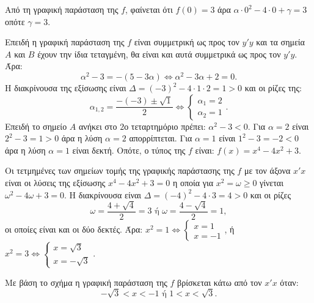 
\begin{alist}
\item Από τη γραφική παράσταση της $f$, φαίνεται ότι $f(0) = 3$ άρα $\alpha \cdot 0^2 - 4 \cdot 0 + \gamma = 3$ οπότε
$\gamma = 3$.

\item Επειδή η γραφική παράσταση της $f$ είναι συμμετρική ως προς τον $y'y$ και τα σημεία $A$ και
$B$ έχουν την ίδια τεταγμένη, θα είναι και αυτά συμμετρικά ως προς τον $y'y$. Άρα:
\[\alpha^2 - 3 = -(5 - 3\alpha) \Leftrightarrow \alpha^2 - 3\alpha + 2 = 0.\]
Η διακρίνουσα της εξίσωσης είναι $\Delta = (-3)^2 - 4 \cdot 1 \cdot 2 = 1 > 0$ και οι ρίζες της:
\[\alpha_{1, 2} = \dfrac{-(-3) \pm \sqrt{1}}{2} \Leftrightarrow \begin{cases} \alpha_1 = 2 \\ \alpha_2 = 1 \end{cases}.\]
Επειδή το σημείο $A$ ανήκει στο $2$ο τεταρτημόριο πρέπει:
$\alpha^2 - 3 < 0$.
Για $\alpha = 2$ είναι $2^2 - 3 = 1 > 0$ άρα η λύση $\alpha = 2$ απορρίπτεται.
Για $\alpha = 1$ είναι $1^2 - 3 = -2 < 0$ άρα η λύση $\alpha = 1$ είναι δεκτή.
Οπότε, ο τύπος της $f$ είναι:
$f(x) = x^4 - 4x^2 + 3$.

\item Οι τετμημένες των σημείων τομής της γραφικής παράστασης της $f$ με τον άξονα $x'x$ είναι
οι λύσεις της εξίσωσης $x^4 - 4x^2 + 3 = 0$ η οποία για $x^2 = \omega \ge 0$ γίνεται $\omega^2 - 4\omega + 3 = 0$.
Η διακρίνουσα είναι $\Delta = (-4)^2 - 4 \cdot 3 = 4 > 0$ και οι ρίζες
\[\omega = \dfrac{4+\sqrt{4}}{2} = 3 \text{ ή } \omega = \dfrac{4-\sqrt{4}}{2} = 1,\]
οι οποίες είναι και οι δύο δεκτές. Άρα:
$x^2 = 1 \Leftrightarrow \begin{cases} x = 1 \\ x = -1 \end{cases}$, ή $x^2 = 3 \Leftrightarrow \begin{cases} x = \sqrt{3} \\ x = -\sqrt{3} \end{cases}$.

\item Με βάση το σχήμα η γραφική παράσταση της $f$ βρίσκεται κάτω από τον $x'x$ όταν:
\[-\sqrt{3} < x < -1 \text{ ή } 1 < x < \sqrt{3}.\]
\end{alist}

